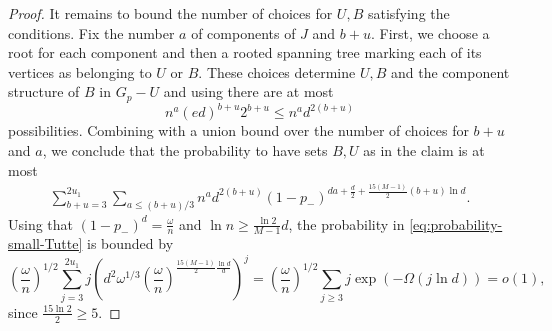 \documentclass[10pt,a4paper]{article}
\newcommand{\cP}{\mathcal{P}}
\begin{document}
\begin{proof}
It remains to bound the number of choices for $U, B$ satisfying the conditions. Fix the number $a$ of components of $J$ and $b+u$. First, we choose a root for each component and then a rooted spanning tree marking each of its vertices as belonging to $U$ or $B$. These choices determine $U, B$ and the component structure of $B$ in $G_p-U$ and using  there are at most
\[
n^a (ed)^{b+u} 2^{b+u} \leq n^a d^{2(b+u)}
\]
possibilities.
Combining with a union bound over the number of choices for $b+u$ and $a$, we conclude that the probability to have sets $B, U$ as in the claim is at most
\begin{align} \label{eq:probability-small-Tutte}
    \sum_{b+u=3}^{2u_1} \sum_{a \leq (b+u)/3} n^a d^{2(b+u)} (1-p_-)^{da + \frac{d}{2}+\frac{15(M-1)}{2} (b+u) \ln d}.
\end{align}
Using that $(1-p_-)^d= \frac{\omega}{n}$ and $\ln n \geq \frac{\ln 2}{M-1} d$, the probability in \eqref{eq:probability-small-Tutte} is bounded by
\[
\left(\frac{\omega}{n} \right)^{1/2} \sum_{j=3}^{2 u_1} j \left(d^2 \omega^{1/3} \left( \frac{\omega}{n}\right)^{\frac{15(M-1)}{2} \frac{\ln d}{d}} \right)^j = \left(\frac{\omega}{n} \right)^{1/2} \sum_{j\geq 3} j \exp\left( - \Omega(j \ln d)\right) = o(1),
\]
since $\frac{15 \ln 2}{2} \geq 5$.




\end{proof}
\end{document}
